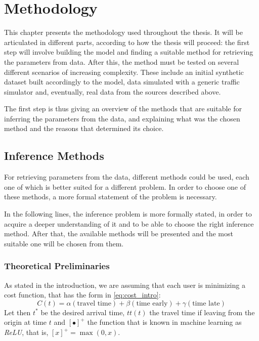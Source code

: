 \chapter{Methodology}
\label{chap:methodology}

This chapter presents the methodology used throughout the thesis.
It will be articulated in different parts, according to how the thesis will proceed:
the first step will involve building the model
and finding a suitable method for retrieving the parameters from data.
After this, the method must be tested on several different scenarios of increasing complexity.
These include an initial synthetic dataset built accordingly to the model,
data simulated with a generic traffic simulator and, eventually,
real data from the sources described above.

The first step is thus giving an overview of the methods that are suitable for inferring the parameters from the data,
and explaining what was the chosen method and the reasons that determined its choice.

\section{Inference Methods}
\label{sec:inference}

For retrieving parameters from the data, different methods could be used,
each one of which is better suited for a different problem.
In order to choose one of these methods, a more formal statement of the problem is necessary.

In the following lines, the inference problem is more formally stated,
in order to acquire a deeper understanding of it and to be able to choose the right inference method.
After that, the available methods will be presented and the most suitable one will be chosen from them.

\subsection{Theoretical Preliminaries}
\label{sec:theo_pre}

As stated in the introduction, we are assuming that each user is minimizing a cost function,
that has the form in \eqref{eq:cost_intro}:
\begin{equation}
  \label{eq:cost_init_inf}
  C(t) = \alpha(\text{travel time}) + \beta (\text{time early}) + \gamma (\text{time late})
\end{equation}
Let then \(t^*\) be the desired arrival time,
\(tt(t)\) the travel time if leaving from the origin at time \(t\) and
\([\bullet]^+\) the function that is known in machine learning as \textit{ReLU}, that is,
\([x]^+ = \max(0, x)\).

